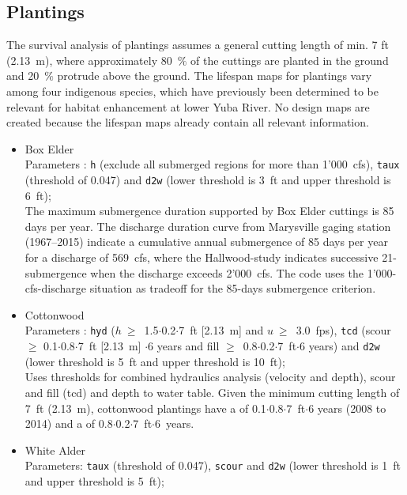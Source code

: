 \subsection{Plantings}\label{sec:plants}
The survival analysis of plantings assumes a general cutting length of min. 7 ft (2.13~m), where approximately 80~$\%$ of the cuttings are planted in the ground and 20~$\%$ protrude above the ground. The lifespan maps for plantings vary among four indigenous species, which have previously been determined to be relevant for habitat enhancement at lower Yuba River. No design maps are created because the lifespan maps already contain all relevant information.
\begin{itemize}
	\item Box Elder\\
	Parameters \citep[extracted from][]{friedman99, kui16a}: \texttt{h} (exclude all submerged regions for more than 1'000~cfs), \texttt{taux} (threshold of 0.047) and \texttt{d2w} (lower threshold is 3~ft and upper threshold is 6~ft);\\
	The maximum submergence duration supported by Box Elder cuttings is 85 days per year. The discharge duration curve from Marysville gaging station (1967--2015) indicate a cumulative annual submergence of 85 days per year for a discharge of 569~cfs, where the Hallwood-study indicates successive 21-submergence when the discharge exceeds 2'000~cfs. The code uses the 1'000-cfs-discharge situation as tradeoff for the 85-days submergence criterion.
	\item Cottonwood\\
	Parameters \citep[extracted from][]{stromberg93, polzin06, wilcox13, bywater15, kui16a}: \texttt{hyd} ($h~\geq$~1.5$\cdot$0.2$\cdot$7~ft [2.13~m] and $u~\geq$~3.0~fps), \texttt{tcd} (scour$\geq$ 0.1$\cdot$0.8$\cdot$7~ft [2.13~m] $\cdot$6 years and fill $\geq$~0.8$\cdot$0.2$\cdot$7~ft$\cdot$6 years) and \texttt{d2w} (lower threshold is 5~ft and upper threshold is 10~ft);\\
	Uses thresholds for combined hydraulics analysis (velocity and depth), scour and fill (tcd) and depth to water table. Given the minimum cutting length of 7~ft (2.13~m), cottonwood plantings have a  of 0.1$\cdot$0.8$\cdot$7~ft$\cdot$6 years (2008 to 2014) and a  of 0.8$\cdot$0.2$\cdot$7~ft$\cdot$6~years.
	\item White Alder\\
	Parameters: \texttt{taux} (threshold of 0.047), \texttt{scour} \citep[$\geq$~1~ft$\cdot$6~years, cf.][]{jablkowski17} and \texttt{d2w} (lower threshold is 1~ft and upper threshold is 5~ft);\\

\end{itemize}
